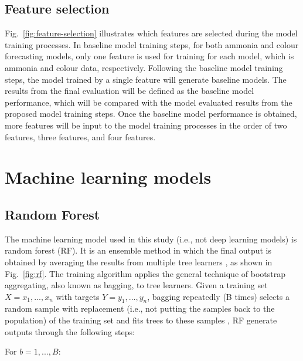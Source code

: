 \subsection{Feature selection}
Fig.~\ref{fig:feature-selection} illustrates which features are selected during the model training processes. In baseline model training steps, for both ammonia and colour forecasting models, only one feature is used for training for each model, which is ammonia and colour data, respectively. Following the baseline model training steps, the model trained by a single feature will generate baseline models. The results from the final evaluation will be defined as the baseline model performance, which will be compared with the model evaluated results from the proposed model training steps. Once the baseline model performance is obtained, more features will be input to the model training processes in the order of two features, three features, and four features.

\section{Machine learning models}
\subsection{Random Forest}
The machine learning model used in this study (i.e., not deep learning models) is random forest (RF). It is an ensemble method in which the final output is obtained by averaging the results from multiple tree learners \citep{wangMachineLearningFramework2021}, as shown in Fig.~\ref{fig:rf}. The training algorithm applies the general technique of bootstrap aggregating, also known as bagging, to tree learners. Given a training set $X = x_1, ..., x_n$ with targets $Y = y_1, ..., y_n$, bagging repeatedly (B times) selects a random sample with replacement (i.e., not putting the samples back to the population) of the training set and fits trees to these samples \citep{wikipediaRandomForest2022}, RF generate outputs through the following steps:

For $b=1, ..., B:$

